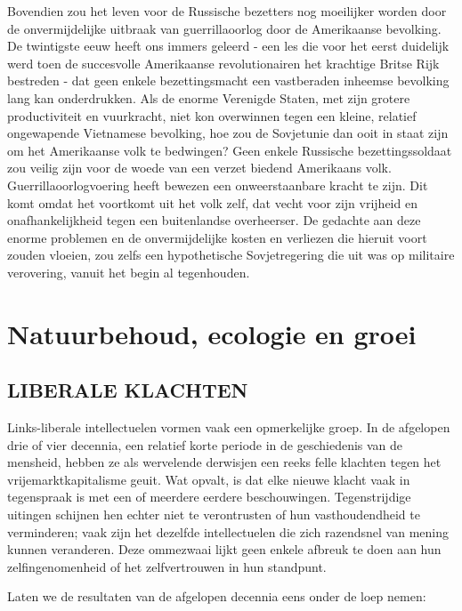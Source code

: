 \documentclass[
  a5paper,
  smalldemyvopaper,10pt,twoside,onecolumn,openright,extrafontsizes,hidelinks]{memoir}
\renewenvironment{quote}%
               {\list{}{\rightmargin=.6cm\leftmargin=.6cm}%
                \itshape \item[]}%
               {\endlist}
\begin{document}
Bovendien zou het leven voor de Russische bezetters nog moeilijker
worden door de onvermijdelijke uitbraak van guerrillaoorlog door de
Amerikaanse bevolking. De twintigste eeuw heeft ons immers geleerd - een
les die voor het eerst duidelijk werd toen de succesvolle Amerikaanse
revolutionairen het krachtige Britse Rijk bestreden - dat geen enkele
bezettingsmacht een vastberaden inheemse bevolking lang kan
onderdrukken. Als de enorme Verenigde Staten, met zijn grotere
productiviteit en vuurkracht, niet kon overwinnen tegen een kleine,
relatief ongewapende Vietnamese bevolking, hoe zou de Sovjetunie dan
ooit in staat zijn om het Amerikaanse volk te bedwingen? Geen enkele
Russische bezettingssoldaat zou veilig zijn voor de woede van een verzet
biedend Amerikaans volk. Guerrillaoorlogvoering heeft bewezen een
onweerstaanbare kracht te zijn. Dit komt omdat het voortkomt uit het
volk zelf, dat vecht voor zijn vrijheid en onafhankelijkheid tegen een
buitenlandse overheerser. De gedachte aan deze enorme problemen en de
onvermijdelijke kosten en verliezen die hieruit voort zouden vloeien,
zou zelfs een hypothetische Sovjetregering die uit was op militaire
verovering, vanuit het begin al tegenhouden.


\chapter{Natuurbehoud, ecologie en
groei}\label{natuurbehoud-ecologie-en-groei}

\section{LIBERALE KLACHTEN}\label{liberale-klachten}

Links-liberale intellectuelen vormen vaak een opmerkelijke groep. In de
afgelopen drie of vier decennia, een relatief korte periode in de
geschiedenis van de mensheid, hebben ze als wervelende derwisjen een
reeks felle klachten tegen het vrijemarktkapitalisme geuit. Wat opvalt,
is dat elke nieuwe klacht vaak in tegenspraak is met een of meerdere
eerdere beschouwingen. Tegenstrijdige uitingen schijnen hen echter niet
te verontrusten of hun vasthoudendheid te verminderen; vaak zijn het
dezelfde intellectuelen die zich razendsnel van mening kunnen
veranderen. Deze ommezwaai lijkt geen enkele afbreuk te doen aan hun
zelfingenomenheid of het zelfvertrouwen in hun standpunt.

\begin{quote}
Laten we de resultaten van de afgelopen decennia eens onder de loep
nemen:
\end{quote}
\end{document}
